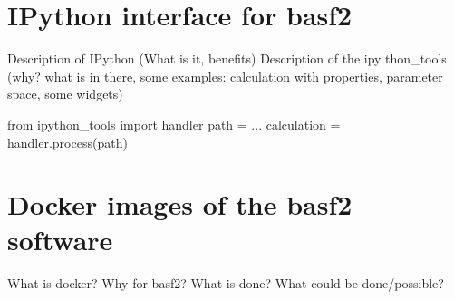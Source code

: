 \section{IPython interface for basf2}

Description of IPython (What is it, benefits)
Description of the ipy thon\_tools (why? what is in there, some examples: calculation with properties, parameter space, some widgets)

\begin{ipythonnb}
from ipython_tools import handler
path = ...
calculation = handler.process(path)
\end{ipythonnb}

\section{Docker images of the basf2 software}

What is docker?
Why for basf2?
What is done?
What could be done/possible?